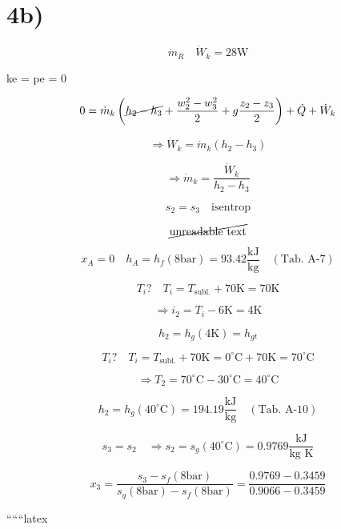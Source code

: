

\section*{4b)}

\[
\dot{m}_R \quad \dot{W}_k = 28 \text{W}
\]

 ke = pe = 0   

\[
0 = \dot{m}_k \left( \cancel{h_2 - h_3} + \frac{w_2^2 - w_3^2}{2} + g \frac{z_2 - z_3}{2} \right) + \dot{Q} + \dot{W}_k
\]

\[
\Rightarrow \dot{W}_k = \dot{m}_k \left( h_2 - h_3 \right)
\]

\[
\Rightarrow \dot{m}_k = \frac{\dot{W}_k}{h_2 - h_3}
\]

\[
s_2 = s_3 \quad \text{isentrop}
\]

\[
\cancel{\text{unreadable text}}
\]

\[
x_A = 0 \quad h_A = h_f (8 \text{bar}) = 93.42 \frac{\text{kJ}}{\text{kg}} \quad (\text{Tab. A-7})
\]

\[
T_i? \quad T_i = T_{\text{subl.}} + 70 \text{K} = 70 \text{K}
\]

\[
\Rightarrow i_2 = T_i - 6 \text{K} = 4 \text{K}
\]

\[
h_2 = h_{g} (4 \text{K}) = h_{gt}
\]

\[
T_i? \quad T_i = T_{\text{subl.}} + 70 \text{K} = 0^\circ \text{C} + 70 \text{K} = 70^\circ \text{C}
\]

\[
\Rightarrow T_2 = 70^\circ \text{C} - 30^\circ \text{C} = 40^\circ \text{C}
\]

\[
h_2 = h_g (40^\circ \text{C}) = 194.19 \frac{\text{kJ}}{\text{kg}} \quad (\text{Tab. A-10})
\]

\[
s_3 = s_2 \quad \Rightarrow s_2 = s_g (40^\circ \text{C}) = 0.9769 \frac{\text{kJ}}{\text{kg K}}
\]

\[
x_3 = \frac{s_3 - s_f (8 \text{bar})}{s_g (8 \text{bar}) - s_f (8 \text{bar})} = \frac{0.9769 - 0.3459}{0.9066 - 0.3459}
\]

``````latex